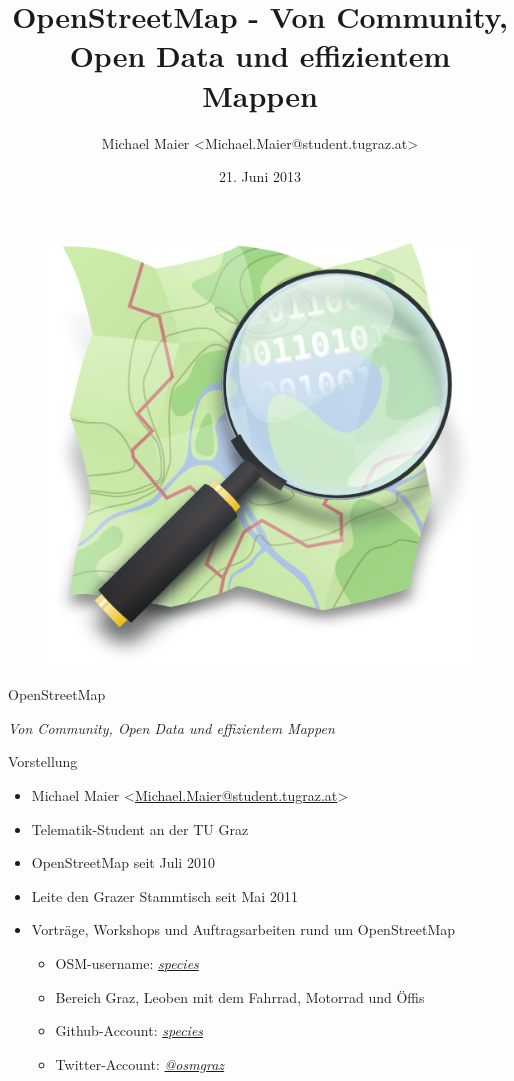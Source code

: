 \documentclass{beamer}
\title{OpenStreetMap - Von Community, Open Data und effizientem Mappen}
\author{Michael Maier \textless Michael.Maier@student.tugraz.at\textgreater}
\date{21. Juni 2013}
\begin{document}

\begin{frame} 


\begin{figure}
  \centering
  \includegraphics[width=.5\textwidth]{mag_map.png}
\end{figure}

\begin{center}
\Huge{OpenStreetMap\\}
\end{center}

\begin{center}
\Large{\emph{Von Community, Open Data und effizientem Mappen}}
\end{center}

\end{frame}



\begin{frame}{Vorstellung}

  \begin{itemize}
    \item Michael Maier \textless \href{mailto:Michael.Maier@student.tugraz.at}{Michael.Maier@student.tugraz.at}\textgreater
    \item Telematik-Student an der TU Graz 
    \item OpenStreetMap seit Juli 2010
    \item Leite den Grazer Stammtisch seit Mai 2011
    \item Vorträge, Workshops und Auftragsarbeiten rund um OpenStreetMap
	    \pause
    \begin{itemize}
      \item OSM-username: \emph{\href{http://www.openstreetmap.org/user/species}{species}}
      \item Bereich Graz, Leoben mit dem Fahrrad, Motorrad und Öffis
      \item Github-Account: \emph{\href{https://github.com/species}{species}}
      \item Twitter-Account: \emph{\href{https://twitter.com/osmgraz}{@osmgraz}}
    \end{itemize}
  \end{itemize}
\end{frame}
\end{document}
